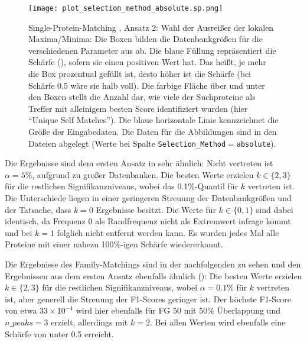         \begin{figure}[H]
            \texttt{[image: plot\_selection\_method\_absolute.sp.png]}
            \caption[Single-Protein-Matching , Ansatz 2: Wahl der Ausreißer der lokalen Maxima/Minima]{Single-Protein-Matching , Ansatz 2: Wahl der Ausreißer der lokalen Maxima/Minima: Die Boxen bilden die Datenbankgrößen für die verschiedenen Parameter aus  ab. Die blaue Füllung repräsentiert die Schärfe (), sofern sie einen positiven Wert hat. Das heißt, je mehr die Box prozentual gefüllt ist, desto höher ist die Schärfe (bei Schärfe 0.5 wäre sie halb voll). Die farbige Fläche über und unter den Boxen stellt die Anzahl dar, wie viele der Suchproteine als Treffer mit alleinigem besten Score identifiziert wurden (hier ``Unique Self Matches''). Die blaue horizontale Linie kennzeichnet die Größe der Eingabedaten. Die Daten für die Abbildungen sind in den Dateien  abgelegt (Werte bei Spalte \texttt{Selection\_Method}$=$\texttt{absolute}).}
            \label{fig:selection_method.absolute.sp}
        \end{figure}

        Die Ergebnisse sind dem ersten Ansatz in  sehr ähnlich: Nicht vertreten ist $\alpha=5\%$, aufgrund zu großer Datenbanken. Die besten Werte erzielen $k \in \{2, 3\}$ für die restlichen Signifikanzniveaus, wobei das 0.1\%-Quantil für $k$ vertreten ist. Die Unterschiede liegen in einer geringeren Streuung der Datenbankgrößen und der Tatsache, dass $k=0$ Ergebnisse besitzt. Die Werte für $k \in \{0, 1\}$ sind dabei identisch, da Frequenz 0 als Randfrequenz nicht als Extremwert infrage kommt und bei $k=1$ folglich nicht entfernt werden kann. Es wurden jedes Mal alle Proteine mit einer nahezu 100\%-igen Schärfe wiedererkannt.

        Die Ergebnisse des Family-Matchings sind in der nachfolgenden  zu sehen und den Ergebnissen aus dem ersten Ansatz ebenfalls ähnlich (): Die besten Werte erzielen $k \in \{2, 3\}$ für die restlichen Signifikanzniveaus, wobei $\alpha=0.1\%$ für $k$ vertreten ist, aber generell die Streuung der F1-Scores geringer ist. Der höchste F1-Score von etwa $33\times 10^{-4}$ wird hier ebenfalls für \ac{FG} 50 mit 50\% Überlappung und $n\_peaks=3$ erzielt, allerdings mit $k=2$. Bei allen Werten wird ebenfalls eine Schärfe von unter 0.5 erreicht.

